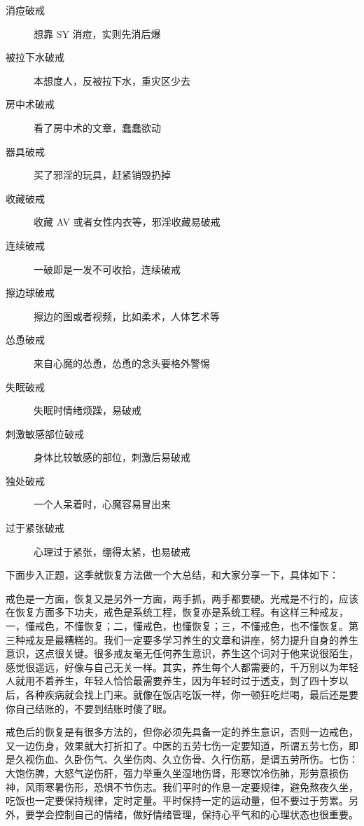 \documentclass{ctexart}
\begin{document}
\begin{adjustwidth}{-5em}{-5em}
\begin{multicols}{2}
\begin{description}
            \item[消痘破戒] 想靠 SY 消痘，实则先消后爆
            \item[被拉下水破戒] 本想度人，反被拉下水，重灾区少去
            \item[房中术破戒] 看了房中术的文章，蠢蠢欲动
            \item[器具破戒] 买了邪淫的玩具，赶紧销毁扔掉
            \item[收藏破戒] 收藏 AV 或者女性内衣等，邪淫收藏易破戒
            \item[连续破戒] 一破即是一发不可收拾，连续破戒
            \item[擦边球破戒] 擦边的图或者视频，比如柔术，人体艺术等
            \item[怂恿破戒] 来自心魔的怂恿，怂恿的念头要格外警惕
            \item[失眠破戒] 失眠时情绪烦躁，易破戒
            \item[刺激敏感部位破戒] 身体比较敏感的部位，刺激后易破戒
            \item[独处破戒] 一个人呆着时，心魔容易冒出来
            \item[过于紧张破戒] 心理过于紧张，绷得太紧，也易破戒
        \end{description}
    \end{multicols}
\end{adjustwidth}

下面步入正题，这季就恢复方法做一个大总结，和大家分享一下，具体如下：

戒色是一方面，恢复又是另外一方面，两手抓，两手都要硬。光戒是不行的，应该在恢复方面多下功夫，戒色是系统工程，恢复亦是系统工程。有这样三种戒友，一，懂戒色，不懂恢复；二，懂戒色，也懂恢复；三，不懂戒色，也不懂恢复。第三种戒友是最糟糕的。我们一定要多学习养生的文章和讲座，努力提升自身的养生意识，这点很关键。很多戒友毫无任何养生意识，养生这个词对于他来说很陌生，感觉很遥远，好像与自己无关一样。其实，养生每个人都需要的，千万别以为年轻人就用不着养生，年轻人恰恰最需要养生，因为年轻时过于透支，到了四十岁以后，各种疾病就会找上门来。就像在饭店吃饭一样，你一顿狂吃烂喝，最后还是要你自己结账的，不要到结账时傻了眼。

戒色后的恢复是有很多方法的，但你必须先具备一定的养生意识，否则一边戒色，又一边伤身，效果就大打折扣了。中医的五劳七伤一定要知道，所谓五劳七伤，即是久视伤血、久卧伤气、久坐伤肉、久立伤骨、久行伤筋，是谓五劳所伤。七伤：大饱伤脾，大怒气逆伤肝，强力举重久坐湿地伤肾，形寒饮冷伤肺，形劳意损伤神，风雨寒暑伤形，恐惧不节伤志。我们平时的作息一定要规律，避免熬夜久坐，吃饭也一定要保持规律，定时定量。平时保持一定的运动量，但不要过于劳累。另外，要学会控制自己的情绪，做好情绪管理，保持心平气和的心理状态也很重要。
\end{document}

